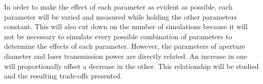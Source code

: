 In order to make the effect of each parameter as evident as possible, each
parameter will be varied and measured while holding the other parameters
constant.
This will also cut down on the number of simulations because it will not
be necessary to simulate every possible combination of parameters to determine
the effects of each parameter.
However, the parameters of aperture diameter and laser transmission power
are directly related.
An increase in one will proportionally offset a decrease in the other.
This relationship will be studied and the resulting trade-offs presented.